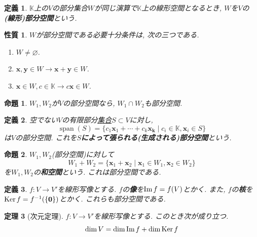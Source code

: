 \documentclass[a4j,dvipdfmx]{jsarticle}
\DeclareMathOperator{\Span}{span}
\newcommand{\K}{\mathbb{K}}
\newcommand{\Ker}{\mathrm{Ker}\hspace{0.5mm}}
\renewcommand{\Im}{\mathrm{Im}\hspace{0.5mm}}
\theoremstyle{mystyle}
\newtheorem*{definition}{定義}
\newtheorem{theorem}{定理}[section]
\newtheorem{proposition}[theorem]{命題}
\newtheorem*{property}{性質}
\begin{document}
    \begin{definition}
        $\K$上の$V$の部分集合$W$が同じ演算で$\K$上の線形空間となるとき, $W$を$V$の\textbf{(線形)部分空間}という.
    \end{definition}
    \begin{property}
        $W$が部分空間である必要十分条件は, 次の三つである.
        \begin{enumerate}
            \item $W\neq \varnothing$.
            \item $\bm{x},\bm{y}\in W\rightarrow \bm{x}+\bm{y}\in W$.
            \item $\bm{x}\in W,c\in \K\rightarrow c\bm{x}\in W$.
        \end{enumerate}
    \end{property}
    \begin{proposition}
        $W_1,W_2$が$V$の部分空間なら, $W_1\cap W_2$も部分空間.
    \end{proposition}
    \begin{definition}
        空でない$V$の有限部分\underline{集合}$S\subset V$に対し,
        \begin{equation*}
            \Span(S) = \{c_1\bm{x}_1+\cdots+c_{k}\bm{x_k}\mid c_i\in\K,\bm{x}_i\in S\}
        \end{equation*}
        は$V$の部分空間. これを\textbf{$S$によって張られる(生成される)部分空間}という.
    \end{definition}
    \clearpage
    \begin{proposition}
        $W_1,W_2$(部分空間)に対して
        \begin{equation*}
            W_1+W_2=\{\bm{x}_1+\bm{x}_2\mid \bm{x}_1\in W_1,\bm{x}_2\in W_2\}
        \end{equation*}
        を$W_1,W_2$の\textbf{和空間}という. これは部分空間である.
    \end{proposition}
    \begin{definition}
        $f:V\to V'$を線形写像とする. $f$の\textbf{像}を$\Im f=f(V)$とかく. また, $f$の\textbf{核}を$\Ker f = f^{-1}(\{\bm{0}\})$とかく. これらも部分空間である.
    \end{definition}
    \begin{theorem}[次元定理]
        $f:V\to V'$を線形写像とする. このとき次が成り立つ.
        \begin{equation*}
            \dim V=\dim \Im f+\dim\Ker f
        \end{equation*}
    \end{theorem}
\end{document}
